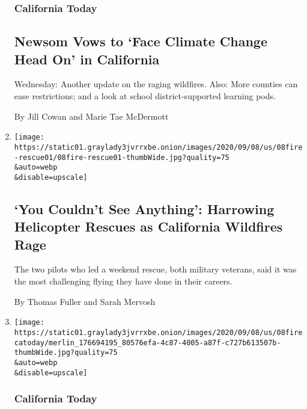 \begin{enumerate}
{  \subsubsection{California Today}\label{california-today-2}}

  \hypertarget{newsom-vows-to-face-climate-change-head-on-in-california}{%
  \subsection{Newsom Vows to `Face Climate Change Head On' in
  California}\label{newsom-vows-to-face-climate-change-head-on-in-california}}

  Wednesday: Another update on the raging wildfires. Also: More counties
  can ease restrictions; and a look at school district-supported
  learning pods.

  By Jill Cowan and Marie Tae McDermott
\item
  \href{/2020/09/08/us/california-wildfires-helicopter-rescue.html}{}

  \texttt{[image: https://static01.graylady3jvrrxbe.onion/images/2020/09/08/us/08fire-rescue01/08fire-rescue01-thumbWide.jpg?quality=75\\\&auto=webp\\\&disable=upscale]}

  \hypertarget{you-couldnt-see-anything-harrowing-helicopter-rescues-as-california-wildfires-rage}{%
  \subsection{`You Couldn't See Anything': Harrowing Helicopter Rescues
  as California Wildfires
  Rage}\label{you-couldnt-see-anything-harrowing-helicopter-rescues-as-california-wildfires-rage}}

  The two pilots who led a weekend rescue, both military veterans, said
  it was the most challenging flying they have done in their careers.

  By Thomas Fuller and Sarah Mervosh
\item
  \href{/2020/09/08/us/california-wildfire-heat-wave.html}{}

  \texttt{[image: https://static01.graylady3jvrrxbe.onion/images/2020/09/08/us/08firecatoday/merlin\_176694195\_80576efa-4c87-4005-a87f-c727b613507b-thumbWide.jpg?quality=75\\\&auto=webp\\\&disable=upscale]}

  \hypertarget{california-today-3}{%
  \subsubsection{California Today}\label{california-today-3}}


\end{enumerate}
